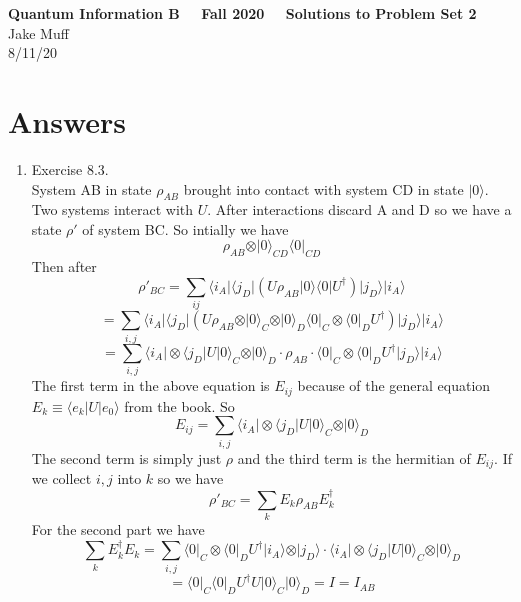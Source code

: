 \documentclass[12pt]{article}
\newcommand{\ket}[1]{\vert{#1}\rangle}
\newcommand{\bra}[1]{\langle{#1}\vert}
\begin{document}
\normalsize

\baselineskip 14pt

\begin{center}
{\Large {\bf Quantum Information B \ \ Fall 2020 \ \  Solutions to Problem Set 2}} \\
Jake Muff \\
8/11/20
\end{center}

\bigskip
\section{Answers}



\begin{enumerate}
    \item Exercise 8.3. \\
    System AB in state $\rho_{AB}$ brought into contact with system CD in state $\ket{0}$. Two systems interact with $U$. After interactions discard A and D so we have a state $\rho'$ of system BC. So intially we have 
    $$ \rho_{AB} \otimes \ket{0}_{CD} \bra{0}_{CD} $$
    Then after 
    $$ \rho'_{BC} = \sum_{ij} \bra{i_A} \bra{j_D} ( U \rho_{AB} \ket{0}\bra{0} U^{\dagger} ) \ket{j_D} \ket{i_A} $$
    $$ = \sum_{i,j} \bra{i_A} \bra{j_D} ( U \rho_{AB} \otimes \ket{0}_C \otimes \ket{0}_D \bra{0}_C \otimes \bra{0}_D U^{\dagger}) \ket{j_D} \ket{i_A} $$
    $$ = \sum_{i,j} \bra{i_A} \otimes \bra{j_D} U \ket{0}_C \otimes \ket{0}_D \cdot \rho_{AB} \cdot \bra{0}_C \otimes \bra{0}_D U^{\dagger} \ket{j_D} \ket{i_A} $$
    The first term in the above equation is $E_{ij}$ because of the general equation $E_k \equiv \langle e_k | U | e_0 \rangle $ from the book. So 
    $$ E_{ij} = \sum_{i,j} \bra{i_A} \otimes \bra{j_D} U \ket{0}_C \otimes \ket{0}_D $$
    The second term is simply just $\rho$ and the third term is the hermitian of $E_{ij}$. If we collect $i,j$ into $k$ so we have 
    $$ \rho'_{BC} = \sum_k E_k \rho_{AB} E_k^{\dagger} $$
    For the second part we have 
    $$ \sum_k E_k^{\dagger} E_k = \sum_{i,j} \bra{0}_C \otimes \bra{0}_D U^{\dagger} \ket{i_A} \otimes \ket{j_D} \cdot \bra{i_A} \otimes \bra{j_D} U \ket{0}_C \otimes \ket{0}_D $$
    $$ = \bra{0}_C \bra{0}_D U^{\dagger} U \ket{0}_C \ket{0}_D = I = I_{AB} $$


\end{enumerate}
\end{document}

